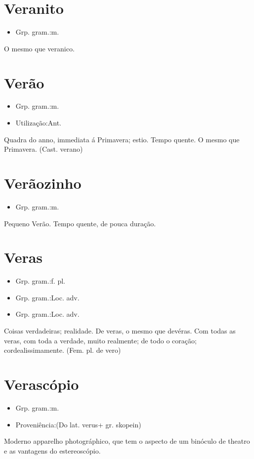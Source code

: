 \documentclass{article}
\begin{document}
\section{Veranito}
\begin{itemize}
\item {Grp. gram.:m.}
\end{itemize}
O mesmo que \textunderscore veranico\textunderscore .
\section{Verão}
\begin{itemize}
\item {Grp. gram.:m.}
\end{itemize}
\begin{itemize}
\item {Utilização:Ant.}
\end{itemize}
Quadra do anno, immediata á Primavera; estio.
Tempo quente.
O mesmo que \textunderscore Primavera\textunderscore .
(Cast. \textunderscore verano\textunderscore )
\section{Verãozinho}
\begin{itemize}
\item {Grp. gram.:m.}
\end{itemize}
Pequeno Verão.
Tempo quente, de pouca duração.
\section{Veras}
\begin{itemize}
\item {Grp. gram.:f. pl.}
\end{itemize}
\begin{itemize}
\item {Grp. gram.:Loc. adv.}
\end{itemize}
\begin{itemize}
\item {Grp. gram.:Loc. adv.}
\end{itemize}
Coisas verdadeiras; realidade.
\textunderscore De veras\textunderscore , o mesmo que \textunderscore devéras\textunderscore .
\textunderscore Com todas as veras\textunderscore , com toda a verdade, muito realmente; de todo o coração; cordealissimamente.
(Fem. pl. de \textunderscore vero\textunderscore )
\section{Verascópio}
\begin{itemize}
\item {Grp. gram.:m.}
\end{itemize}
\begin{itemize}
\item {Proveniência:(Do lat. \textunderscore verus\textunderscore  + gr. \textunderscore skopein\textunderscore )}
\end{itemize}
Moderno apparelho photográphico, que tem o aspecto de um binóculo de theatro e as vantagens do estereoscópio.
\end{document}
